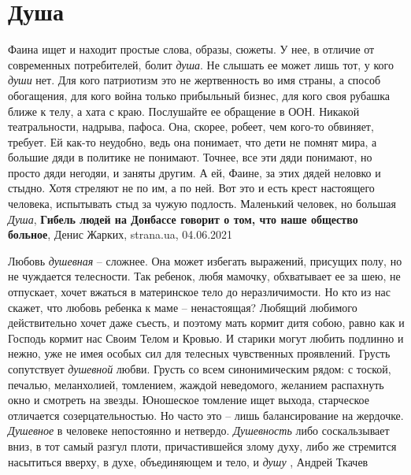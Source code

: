  
 
 
 
 
\chapter{Душа}
\label{sec:slova.dusha}

Фаина ищет и находит простые слова, образы, сюжеты. У нее, в отличие от
современных потребителей, болит \emph{душа}. Не слышать ее может лишь тот, у кого \emph{души}
нет. Для кого патриотизм это не жертвенность во имя страны, а способ
обогащения, для кого война только прибыльный бизнес, для кого своя рубашка
ближе к телу, а хата с краю.  Послушайте ее обращение в ООН. Никакой
театральности, надрыва, пафоса. Она, скорее, робеет, чем кого-то обвиняет,
требует. Ей как-то неудобно, ведь она понимает, что дети не помнят мира, а
большие дяди в политике не понимают. Точнее, все эти дяди понимают, но просто
дяди негодяи, и заняты другим. А ей, Фаине, за этих дядей неловко и стыдно.
Хотя стреляют не по им, а по ней. Вот это и есть крест настоящего человека,
испытывать стыд за чужую подлость. Маленький человек, но большая \emph{Душа},
\textbf{Гибель людей на Донбассе говорит о том, что наше общество больное},
Денис Жарких, strana.ua, 04.06.2021

Любовь \emph{душевная} – сложнее. Она может избегать выражений, присущих полу, но не
чуждается телесности. Так ребенок, любя мамочку, обхватывает ее за шею, не
отпускает, хочет вжаться в материнское тело до неразличимости. Но кто из нас
скажет, что любовь ребенка к маме – ненастоящая? Любящий любимого действительно
хочет даже съесть, и поэтому мать кормит дитя собою, равно как и Господь кормит
нас Своим Телом и Кровью. И старики могут любить подлинно и нежно, уже не имея
особых сил для телесных чувственных проявлений.  Грусть сопутствует \emph{душевной}
любви. Грусть со всем синонимическим рядом: с тоской, печалью, меланхолией,
томлением, жаждой неведомого, желанием распахнуть окно и смотреть на звезды.
Юношеское томление ищет выхода, старческое отличается созерцательностью. Но
часто это – лишь балансирование на жердочке. \emph{Душевное} в человеке непостоянно и
нетвердо. \emph{Душевность} либо соскальзывает вниз, в тот самый разгул плоти,
причастившейся злому духу, либо же стремится насытиться вверху, в духе,
объединяющем и тело, и \emph{душу}
, Андрей Ткачев

